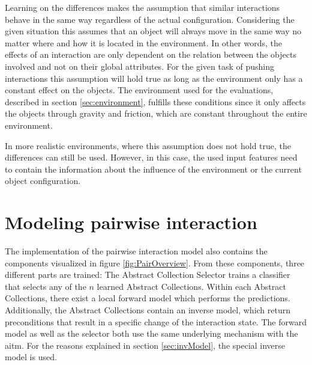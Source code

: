 Learning on the differences makes the assumption that similar interactions behave in the same way regardless of the actual configuration. Considering the given situation this assumes that an object will always move in the same way no matter where and how it is located in the environment. In other words, the effects of an interaction are only dependent on the relation between the objects involved and not on their global attributes. For the given task of pushing interactions this assumption will hold true as long as the environment only has a constant effect on the objects. The environment used for the evaluations, described in section \ref{sec:environment}, fulfills these conditions since it only affects the objects through gravity and friction, which are constant throughout the entire environment. 

In more realistic environments, where this assumption does not hold true, the differences can still be used. However, in this case, the used input features need to contain the information about the influence of the environment or the current object configuration. 



\section{Modeling pairwise interaction \label{sec:pairRealization}}


The implementation of the pairwise interaction model also contains the components visualized in figure \ref{fig:PairOverview}. From these components, three different parts are trained:
The Abstract Collection Selector trains a classifier that selects any of the $n$ learned Abstract Collections. Within each Abstract Collections, there exist a local forward model which performs the predictions. Additionally, the Abstract Collections contain an inverse model, which return preconditions that result in a specific change of the interaction state. The forward model as well as the selector both use the same underlying mechanism with the \gls{aitm}. For the reasons explained in section \ref{sec:invModel}, the special inverse model is used.

